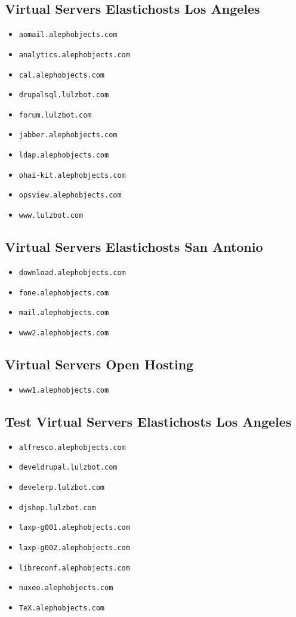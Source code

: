 \subsection{Virtual Servers Elastichosts Los Angeles}
\begin{itemize}
\item \texttt{aomail.alephobjects.com}
\item \texttt{analytics.alephobjects.com}
\item \texttt{cal.alephobjects.com}
\item \texttt{drupalsql.lulzbot.com}
\item \texttt{forum.lulzbot.com}
\item \texttt{jabber.alephobjects.com}
\item \texttt{ldap.alephobjects.com}
\item \texttt{ohai-kit.alephobjects.com}
\item \texttt{opsview.alephobjects.com}
\item \texttt{www.lulzbot.com}
\end{itemize}

\subsection{Virtual Servers Elastichosts San Antonio}
\begin{itemize}
\item \texttt{download.alephobjects.com}
\item \texttt{fone.alephobjects.com}
\item \texttt{mail.alephobjects.com}
\item \texttt{www2.alephobjects.com}
\end{itemize}

\subsection{Virtual Servers Open Hosting}
\begin{itemize}
\item \texttt{www1.alephobjects.com}
\end{itemize}

\subsection{Test Virtual Servers Elastichosts Los Angeles}
\begin{itemize}
\item \texttt{alfresco.alephobjects.com}
\item \texttt{develdrupal.lulzbot.com}
\item \texttt{develerp.lulzbot.com}
\item \texttt{djshop.lulzbot.com}
\item \texttt{laxp-g001.alephobjects.com}
\item \texttt{laxp-g002.alephobjects.com}
\item \texttt{libreconf.alephobjects.com}
\item \texttt{nuxeo.alephobjects.com}
\item \texttt{TeX.alephobjects.com}
\end{itemize}

